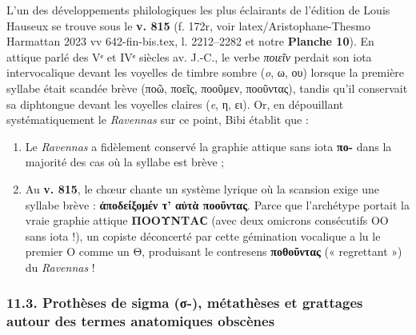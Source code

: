 \documentclass[11pt, a4paper, twoside]{article}
\renewcommand{\_}{\origunderscore\penalty0\relax}
\renewcommand{\texttt}[1]{#1}
\newcommand{\Bibi}{\textit{Bibi}}
\def\Bibi{Bibi}%
\begin{document}
L'un des développements philologiques les plus éclairants de l'édition de Louis Hauseux se trouve sous le \textbf{v. 815} (\texttt{f. 172r}, voir \texttt{latex/Aristophane-Thesmo Harmattan 2023 vv 642-fin-bis.tex}, l. 2212–2282 et notre \textbf{Planche 10}).
En attique parlé des Vᵉ et IVᵉ siècles av. J.-C., le verbe \textit{ποιεῖν} perdait son iota intervocalique devant les voyelles de timbre sombre (\textit{o}, ω, ου) lorsque la première syllabe était scandée brève (\texttt{ποῶ}, \texttt{ποεῖς}, \texttt{ποοῦμεν}, \texttt{ποοῦντας}), tandis qu'il conservait sa diphtongue devant les voyelles claires (\textit{e}, η, ει).
Or, en dépouillant systématiquement le \textit{Ravennas} sur ce point, \Bibi{} établit que :
\begin{enumerate}[leftmargin=1.6em, itemsep=2pt]
  \item Le \textit{Ravennas} a fidèlement conservé la graphie attique sans iota \textbf{\texttt{πο-}} dans la majorité des cas où la syllabe est brève ;
  \item Au \textbf{v. 815}, le chœur chante un système lyrique où la scansion exige une syllabe brève : \textbf{\texttt{ἀποδείξομέν τ' αὐτὰ ποοῦντας}}. Parce que l'archétype portait la vraie graphie attique \textbf{\texttt{ΠΟΟΥΝΤΑϹ}} (avec deux omicrons consécutifs \texttt{ΟΟ} sans iota !), un copiste déconcerté par cette gémination vocalique a lu le premier \texttt{Ο} comme un \texttt{Θ}, produisant le contresens \textbf{\texttt{ποθοῦντας}} (« regrettant ») du \textit{Ravennas} !
\end{enumerate}


\subsubsection{11.3. Prothèses de sigma (σ-), métathèses et grattages autour des termes anatomiques obscènes}
\end{document}
